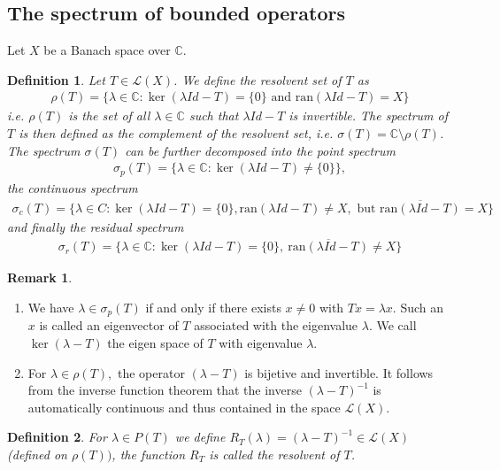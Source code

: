 \documentclass[11pt,a4paper]{article}
\newtheorem{defn}{Definition}[section]
\theoremstyle{definition}
\newtheorem{rem}{Remark}[section]
\begin{document}
\subsection{The spectrum of bounded operators}
Let $X$ be a Banach space over $\mathbb{C}$. 
\begin{defn} Let $T \in \mathcal{L}(X)$. We define the resolvent set of $T$ as 
\begin{align*}
\rho(T)= \lbrace \lambda \in \mathbb{C}: \ker( \lambda Id-T)= \lbrace 0 \rbrace \text{ and } \text{ran}( \lambda Id-T)=X \rbrace 
\end{align*}
i.e. $\rho(T)$ is the set of all $\lambda \in \mathbb{C}$ such that $ \lambda Id-T$ is invertible. The spectrum of $T$ is then defined as the complement of the resolvent set, i.e. $\sigma(T)= \mathbb{C} \setminus \rho(T)$. The spectrum $\sigma(T)$ can be further decomposed into the point spectrum 
\begin{align*}
\sigma_p(T)= \lbrace \lambda \in \mathbb{C}:  \ker( \lambda Id-T) \neq \lbrace 0 \rbrace \rbrace,
\end{align*}
the continuous spectrum 
\begin{align*}
\sigma_c(T)= \lbrace \lambda \in C : \ker( \lambda Id-T)= \lbrace 0 \rbrace, \text{ran}( \lambda Id-T) \neq X, \text{ but } \overline{\text{ran}(\lambda Id-T)}= X \rbrace 
\end{align*}
and finally the residual spectrum
\begin{align*}
\sigma_r(T)= \lbrace \lambda \in \mathbb{C}: \ker( \lambda Id-T)= \lbrace 0 \rbrace,\ \overline{\text{ran}(\lambda Id-T)} \neq X \rbrace 
\end{align*}
\end{defn}
\begin{rem} \ 
\begin{enumerate}
\item We have $\lambda \in \sigma_p(T)$ if and only if there exists $x \neq 0$ with $Tx= \lambda x$. Such an $x$ is called an eigenvector of $T$ associated with the eigenvalue $\lambda$. We call $\ker( \lambda-T)$ the eigen space of $T$ with eigenvalue $\lambda$. 
\item For $\lambda \in \rho(T),$ the operator $( \lambda-T)$ is bijetive and invertible. It follows from the inverse function theorem that the inverse $( \lambda-T)^{-1}$ is automatically continuous and thus contained in the space $\mathcal{L}(X)$. 
\end{enumerate}
\end{rem}
\begin{defn} For $ \lambda \in P(T)$ we define $R_T( \lambda) = ( \lambda-T)^{-1} \in \mathcal{L}(X)$ (defined on $\rho(T))$, the function $R_T$ is called the resolvent of $T$. 
\end{defn}
\end{document}
